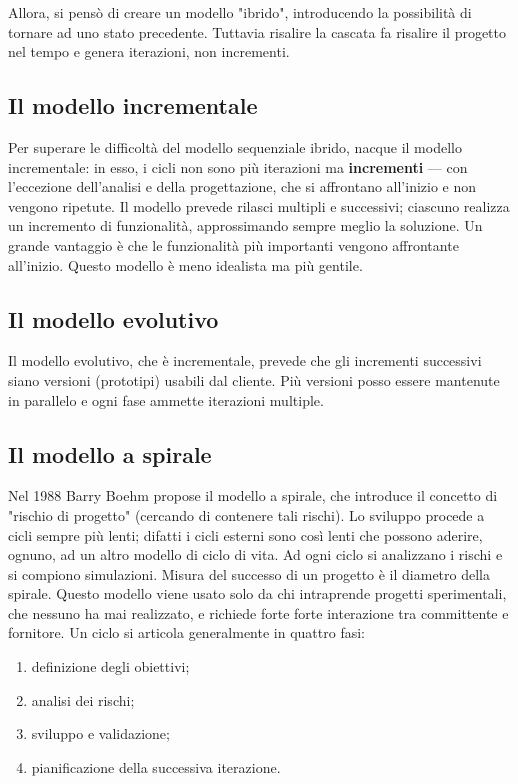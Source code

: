\documentclass[a4paper]{article}
\begin{document}
Allora, si pensò di creare un modello "ibrido", introducendo la possibilità di tornare ad uno stato precedente. Tuttavia risalire la cascata fa risalire il progetto nel tempo e genera iterazioni, non incrementi.

		
	\subsection{Il modello incrementale}

		
Per superare le difficoltà del modello sequenziale ibrido, nacque il modello incrementale: in esso, i cicli non sono più iterazioni ma \textbf{incrementi} — con l'eccezione dell'analisi e della progettazione, che si affrontano all'inizio e non vengono ripetute. Il modello prevede rilasci multipli e successivi; ciascuno realizza un incremento di funzionalità, approssimando sempre meglio la soluzione. Un grande vantaggio è che le funzionalità più importanti vengono affrontante all'inizio. Questo modello è meno idealista ma più gentile.

		
	\subsection{Il modello evolutivo}

		
Il modello evolutivo, che è incrementale, prevede che gli incrementi successivi siano versioni (prototipi) usabili dal cliente. Più versioni posso essere mantenute in parallelo e ogni fase ammette iterazioni multiple. %


		
	\subsection{Il modello a spirale}

		
Nel 1988 Barry Boehm propose il modello a spirale, che introduce il concetto di "rischio di progetto" (cercando di contenere tali rischi). Lo sviluppo procede a cicli sempre più lenti; difatti i cicli esterni sono così lenti che possono aderire, ognuno, ad un altro modello di ciclo di vita. Ad ogni ciclo si analizzano i rischi e si compiono simulazioni. Misura del successo di un progetto è il diametro della spirale. Questo modello viene usato solo da chi intraprende progetti sperimentali, che nessuno ha mai realizzato, e richiede forte forte interazione tra committente e fornitore. Un ciclo si articola generalmente in quattro fasi:
		
	\begin{enumerate}
		
			
	\item definizione degli obiettivi;
			
	\item analisi dei rischi;
			
	\item sviluppo e validazione;
			
	\item pianificazione della successiva iterazione.
		
	\end{enumerate}
\end{document}
